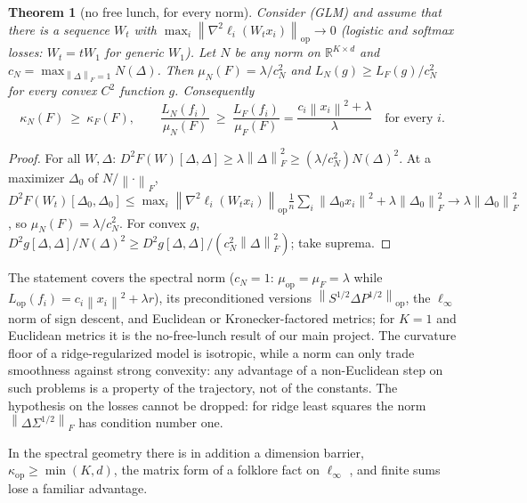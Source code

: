 \documentclass[11pt]{article}
\newtheorem{theorem}{Theorem}
\newcommand{\R}{\mathbb{R}}
\newcommand{\norm}[1]{\left\|#1\right\|}
\newcommand{\nop}[1]{\left\|#1\right\|_{\mathrm{op}}}
\newcommand{\nF}[1]{\left\|#1\right\|_{F}}
\newcommand{\Lop}{L_{\mathrm{op}}}
\newcommand{\muop}{\mu_{\mathrm{op}}}
\newcommand{\kop}{\kappa_{\mathrm{op}}}
\newcommand{\kF}{\kappa_{F}}
\begin{document}
\begin{theorem}[no free lunch, for every norm]\label{thm:nfl}
Consider (GLM) and assume that there is a sequence $W_t$ with $\max_i\nop{\nabla^2\ell_i(W_tx_i)}\to0$ (logistic and
softmax losses: $W_t=tW_1$ for generic $W_1$). Let $N$ be any norm on $\R^{K\times d}$ and
$c_N=\max_{\nF\Delta=1}N(\Delta)$. Then $\mu_N(F)=\lambda/c_N^2$ and $L_N(g)\ge L_F(g)/c_N^2$ for every convex $C^2$
function $g$. Consequently
\[
\kappa_N(F)\ \ge\ \kF(F),\qquad \frac{L_N(f_i)}{\mu_N(F)}\ \ge\ \frac{L_F(f_i)}{\mu_F(F)}=\frac{c_i\norm{x_i}^2+\lambda}{\lambda}\quad\text{for every }i .
\]
\end{theorem}
\begin{proof}
For all $W,\Delta$: $D^2F(W)[\Delta,\Delta]\ge\lambda\nF\Delta^2\ge(\lambda/c_N^2)N(\Delta)^2$. At a maximizer
$\Delta_0$ of $N/\nF\cdot$,
$D^2F(W_t)[\Delta_0,\Delta_0]\le\max_i\nop{\nabla^2\ell_i(W_tx_i)}\frac1n\sum_i\norm{\Delta_0x_i}^2+\lambda\nF{\Delta_0}^2
\to\lambda\nF{\Delta_0}^2$, so $\mu_N(F)=\lambda/c_N^2$. For convex $g$,
$D^2g[\Delta,\Delta]/N(\Delta)^2\ge D^2g[\Delta,\Delta]/(c_N^2\nF\Delta^2)$; take suprema.
\end{proof}

The statement covers the spectral norm ($c_N=1$: $\muop=\mu_F=\lambda$ while $\Lop(f_i)=c_i\norm{x_i}^2+\lambda r$),
its preconditioned versions $\nop{S^{1/2}\Delta P^{1/2}}$, the $\ell_\infty$ norm of sign descent, and Euclidean or
Kronecker-factored metrics; for $K=1$ and Euclidean metrics it is the no-free-lunch result of our main project. The
curvature floor of a ridge-regularized model is isotropic, while a norm can only trade smoothness against strong
convexity: any advantage of a non-Euclidean step on such problems is a property of the trajectory, not of the
constants. The hypothesis on the losses cannot be dropped: for ridge least squares the norm
$\nF{\Delta\Sigma^{1/2}}$ has condition number one.

In the spectral geometry there is in addition a dimension barrier, $\kop\ge\min(K,d)$, the matrix form of a folklore
fact on $\ell_\infty$ \cite{sidford2018coordinate}, and finite sums lose a familiar advantage.
\end{document}
